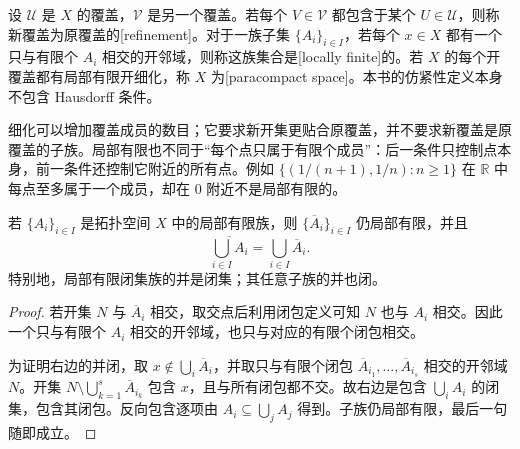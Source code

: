 \begin{definition}\label{g1:def:locally-finite-refinement}
	设 \(\mathcal U\) 是 \(X\) 的覆盖，\(\mathcal V\) 是另一个覆盖。若每个 \(V\in\mathcal V\) 都包含于某个 \(U\in\mathcal U\)，则称新覆盖为原覆盖的[refinement]。对于一族子集 \(\{A_i\}_{i\in I}\)，若每个 \(x\in X\) 都有一个只与有限个 \(A_i\) 相交的开邻域，则称这族集合是[locally finite]的。若 \(X\) 的每个开覆盖都有局部有限开细化，称 \(X\) 为[paracompact space]。本书的仿紧性定义本身不包含 Hausdorff 条件。
\end{definition}

细化可以增加覆盖成员的数目；它要求新开集更贴合原覆盖，并不要求新覆盖是原覆盖的子族。局部有限也不同于“每个点只属于有限个成员”：后一条件只控制点本身，前一条件还控制它附近的所有点。例如 \(\{(1/(n+1),1/n):n\ge1\}\) 在 \(\mathbb R\) 中每点至多属于一个成员，却在 \(0\) 附近不是局部有限的。

\begin{lemma}\label{g1:lem:locally-finite-closures}
	若 \(\{A_i\}_{i\in I}\) 是拓扑空间 \(X\) 中的局部有限族，则 \(\{\overline A_i\}_{i\in I}\) 仍局部有限，并且
	\[
		\overline{\bigcup_{i\in I}A_i}=\bigcup_{i\in I}\overline A_i.
	\]
	特别地，局部有限闭集族的并是闭集；其任意子族的并也闭。
\end{lemma}
\begin{proof}
	若开集 \(N\) 与 \(\overline A_i\) 相交，取交点后利用闭包定义可知 \(N\) 也与 \(A_i\) 相交。因此一个只与有限个 \(A_i\) 相交的开邻域，也只与对应的有限个闭包相交。

	为证明右边的并闭，取 \(x\notin\bigcup_i\overline A_i\)，并取只与有限个闭包 \(\overline A_{i_1},\ldots,\overline A_{i_s}\) 相交的开邻域 \(N\)。开集 \(N\setminus\bigcup_{k=1}^s\overline A_{i_k}\) 包含 \(x\)，且与所有闭包都不交。故右边是包含 \(\bigcup_iA_i\) 的闭集，包含其闭包。反向包含逐项由 \(A_i\subseteq\bigcup_jA_j\) 得到。子族仍局部有限，最后一句随即成立。
\end{proof}

